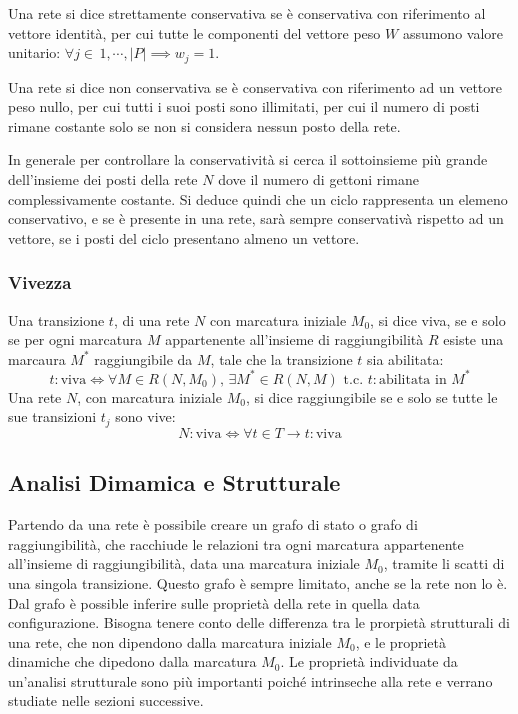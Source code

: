 \documentclass{article}
\numberwithin{equation}{subsection}
\begin{document}
Una rete si dice strettamente conservativa se è conservativa con riferimento al vettore identità, per cui tutte le componenti del vettore peso $W$ assumono valore unitario: 
$\forall j\in\,1,\cdots,|P|\implies w_j=1$. 


Una rete si dice non conservativa se è conservativa con riferimento ad un vettore peso nullo, per cui tutti i suoi posti sono illimitati, per cui il numero di posti rimane 
costante solo se non si considera nessun posto della rete. 

In generale per controllare la conservatività si cerca il sottoinsieme più grande dell'insieme dei posti della rete $N$ dove il numero di gettoni rimane complessivamente 
costante. Si deduce quindi che un ciclo rappresenta un elemeno conservativo, e se è presente in una rete, sarà sempre conservativà rispetto ad un vettore, se i posti del ciclo 
presentano almeno un vettore. 

\subsubsection{Vivezza}

Una transizione $t$, di una rete $N$ con marcatura iniziale $M_0$, si dice viva, se e solo se per ogni marcatura $M$ appartenente all'insieme di raggiungibilità $R$ esiste una 
marcaura $M^*$ raggiungibile da $M$, tale che la transizione $t$ sia abilitata:
\begin{equation*}
    t:\mbox{viva}\iff \forall M\in R(N,M_0),\,\exists M^*\in R(N,M)\mbox{ t.c. } t:\mbox{abilitata in }M^*
\end{equation*}
Una rete $N$, con marcatura iniziale $M_0$, si dice raggiungibile se e solo se tutte le sue transizioni $t_j$ sono vive:
\begin{equation*}
    N:\mbox{viva}\iff \forall t\in T\to t:\mbox{viva} 
\end{equation*}

\subsection{Analisi Dimamica e Strutturale}

Partendo da una rete è possibile creare un grafo di stato o grafo di raggiungibilità, che racchiude le relazioni tra ogni marcatura appartenente all'insieme di raggiungibilità, 
data una marcatura iniziale $M_0$, tramite li scatti di una singola transizione. Questo grafo è sempre limitato, anche se la rete non lo è. Dal grafo è possible inferire sulle 
proprietà della rete in quella data configurazione. 
Bisogna tenere conto delle differenza tra le prorpietà strutturali di una rete, che non dipendono dalla marcatura iniziale $M_0$, e le proprietà dinamiche che dipedono dalla 
marcatura $M_0$. Le proprietà individuate da un'analisi strutturale sono più importanti poiché intrinseche alla rete e verrano studiate nelle sezioni successive. 
\end{document}
